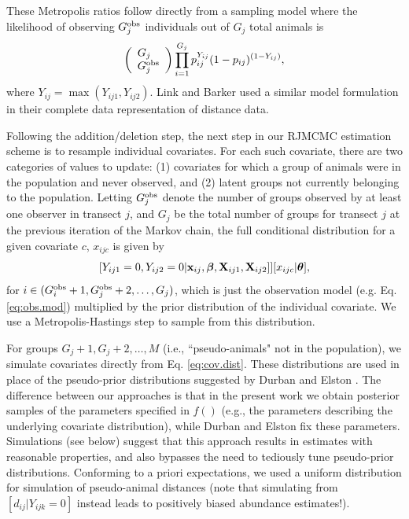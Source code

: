 \documentclass[10pt]{article}
\begin{document}
These Metropolis ratios follow directly from a sampling model where the likelihood of observing $G_j^{\rm obs}$ individuals out of $G_j$ total animals is
$$
\left( \begin{array}{l}
G_j \\
G_j^{\rm obs}
\end{array} \right)
\prod_{i=1}^{G_j} p_{ij}^{Y_{ij}} (1-p_{ij})^{(1-Y_{ij})},
$$
where $Y_{ij}=\max(Y_{ij1},Y_{ij2})$.  Link and Barker \cite{LinkBarker2010} used a similar model formulation in their complete data representation of distance data.

Following the addition/deletion step, the next step in our RJMCMC estimation scheme is to resample individual covariates.  For each such covariate, there are two categories of values to update: (1) covariates for which a group of animals were in the population and never observed, and (2) latent groups not currently belonging to the population. Letting $G_j^{\rm obs}$ denote the number of groups observed by at least one observer in transect $j$, and $G_j$ be the total number of groups for transect $j$ at the previous iteration of the Markov chain, the full conditional distribution for a given covariate $c$, $x_{ijc}$ is given by
$$
[Y_{ij1}=0,Y_{ij2}=0|{\bf x}_{ij},\boldsymbol{\beta},{\bf X}_{ij1},{\bf X}_{ij2}]][x_{ijc}|\boldsymbol{\theta}],
$$
for $i \in (G_i^{\rm obs}+1,G_{j}^{\rm obs}+2,\hdots,G_j)$, 
which is just the observation model (e.g. Eq. \ref{eq:obs.mod}) multiplied by the prior distribution of the individual covariate.  We use a Metropolis-Hastings step to sample from this distribution.

For groups $G_j+1,G_j+2, \hdots,M$ (i.e., ``pseudo-animals" not in the population), we simulate covariates directly from Eq. \ref{eq:cov.dist}.  These distributions are used in place of the pseudo-prior distributions suggested by Durban and Elston \cite{DurbanElston2005}.  The difference between our approaches is that in the present work we obtain posterior samples of the parameters specified in  $f()$ (e.g., the parameters describing the underlying covariate distribution), while Durban and Elston fix these parameters.  Simulations (see below) suggest that this approach results in estimates with reasonable properties, and also bypasses the need to tediously tune pseudo-prior distributions.  Conforming to a priori expectations, we used a uniform distribution for simulation of pseudo-animal distances (note that simulating from $[d_{ij} | Y_{ijk}=0]$ instead leads to positively biased abundance estimates!).
\end{document}
